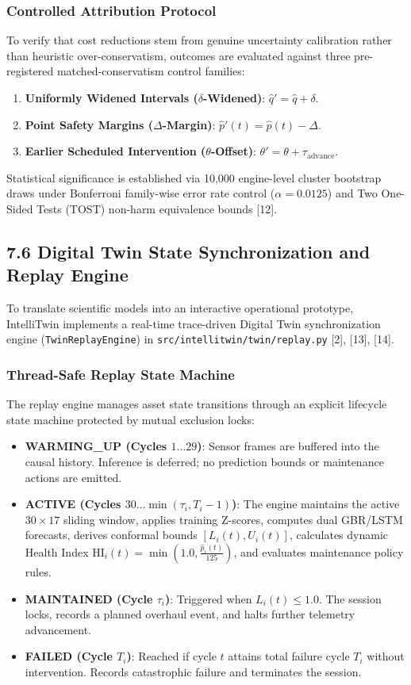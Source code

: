 \documentclass[12pt,a4paper]{article}
\begin{document}
\subsubsection*{Controlled Attribution Protocol}
To verify that cost reductions stem from genuine uncertainty calibration rather than heuristic over-conservatism, outcomes are evaluated against three pre-registered matched-conservatism control families:
\begin{enumerate}
    \item \textbf{Uniformly Widened Intervals ($\delta$-Widened)}: $\hat{q}' = \hat{q} + \delta$.
    \item \textbf{Point Safety Margins ($\Delta$-Margin)}: $\hat{p}'(t) = \hat{p}(t) - \Delta$.
    \item \textbf{Earlier Scheduled Intervention ($\theta$-Offset)}: $\theta' = \theta + \tau_{\text{advance}}$.
\end{enumerate}
Statistical significance is established via 10,000 engine-level cluster bootstrap draws under Bonferroni family-wise error rate control ($\alpha = 0.0125$) and Two One-Sided Tests (TOST) non-harm equivalence bounds [12].

\subsection*{7.6 Digital Twin State Synchronization and Replay Engine}
To translate scientific models into an interactive operational prototype, IntelliTwin implements a real-time trace-driven Digital Twin synchronization engine (\texttt{TwinReplayEngine}) in \texttt{src/intellitwin/twin/replay.py} [2], [13], [14].

\subsubsection*{Thread-Safe Replay State Machine}
The replay engine manages asset state transitions through an explicit lifecycle state machine protected by mutual exclusion locks:
\begin{itemize}
    \item \textbf{WARMING\_UP (Cycles $1 \dots 29$)}: Sensor frames are buffered into the causal history. Inference is deferred; no prediction bounds or maintenance actions are emitted.
    \item \textbf{ACTIVE (Cycles $30 \dots \min(\tau_i, T_i - 1)$)}: The engine maintains the active $30 \times 17$ sliding window, applies training Z-scores, computes dual GBR/LSTM forecasts, derives conformal bounds $[L_i(t), U_i(t)]$, calculates dynamic Health Index $\text{HI}_i(t) = \min(1.0, \frac{\hat{p}_i(t)}{125})$, and evaluates maintenance policy rules.
    \item \textbf{MAINTAINED (Cycle $\tau_i$)}: Triggered when $L_i(t) \le 1.0$. The session locks, records a planned overhaul event, and halts further telemetry advancement.
    \item \textbf{FAILED (Cycle $T_i$)}: Reached if cycle $t$ attains total failure cycle $T_i$ without intervention. Records catastrophic failure and terminates the session.
\end{itemize}
\end{document}
